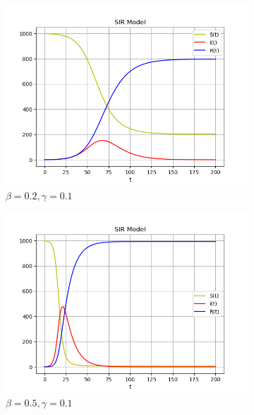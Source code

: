 \documentclass{article}
\begin{document}
\begin{figure}[H]
\centering
\begin{subfigure}{.5\textwidth}
  \centering
  \includegraphics[width=\textwidth]{SIR_1.png}
  \caption{$\beta = 0.2, \gamma = 0.1$}
  \label{fig:sub5}
\end{subfigure}%
\begin{subfigure}{.5\textwidth}
  \centering
  \includegraphics[width=\textwidth]{SIR_2.png}
  \caption{$\beta = 0.5, \gamma = 0.1$}
  \label{fig:sub6}
\end{subfigure}
\begin{subfigure}{.5\textwidth}
  \centering

\end{subfigure}
\end{figure}
\end{document}
